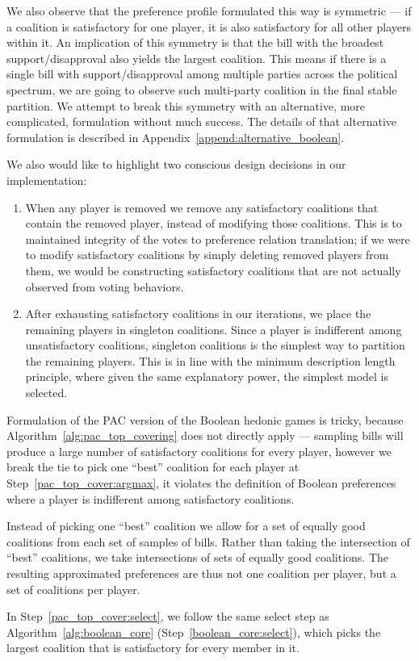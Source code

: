 We also observe that the preference profile formulated this way is symmetric ---
if a coalition is satisfactory for one player, it is also satisfactory for all
other players within it.
An implication of this symmetry is that the bill with the broadest
support/disapproval also yields the largest coalition.
This means if there is a single bill with support/disapproval among multiple
parties across the political spectrum, we are going to observe such multi-party
coalition in the final stable partition.
We attempt to break this symmetry with an alternative, more complicated,
formulation without much success.
The details of that alternative formulation is described in
Appendix~\ref{append:alternative_boolean}.

We also would like to highlight two conscious design decisions in our
implementation:

\begin{enumerate}
  \item When any player is removed we remove any satisfactory coalitions that
    contain the removed player, instead of modifying those coalitions.
    This is to maintained integrity of the votes to preference relation
    translation; if we were to modify satisfactory coalitions by simply
    deleting removed players from them, we would be constructing satisfactory
    coalitions that are not actually observed from voting behaviors.
  \item After exhausting satisfactory coalitions in our iterations, we place
    the remaining players in singleton coalitions.
    Since a player is indifferent among unsatisfactory coalitions, singleton
    coalitions is the simplest way to partition the remaining players.
    This is in line with the minimum description length principle, where given
    the same explanatory power, the simplest model is selected.
\end{enumerate}

Formulation of the PAC version of the Boolean hedonic games is tricky, because
Algorithm~\ref{alg:pac_top_covering} does not directly apply --- sampling bills
will produce a large number of satisfactory coalitions for every player, however
we break the tie to pick one ``best'' coalition for each player at
Step~\ref{pac_top_cover:argmax}, it violates the definition of Boolean
preferences where a player is indifferent among satisfactory coalitions.

Instead of picking one ``best'' coalition we allow for a set of equally good
coalitions from each set of samples of bills.
Rather than taking the intersection of ``best'' coalitions, we take intersections
of sets of equally good coalitions.
The resulting approximated preferences are thus not one coalition per player,
but a set of coalitions per player.

In Step~\ref{pac_top_cover:select}, we follow the same select step as
Algorithm~\ref{alg:boolean_core} (Step~\ref{boolean_core:select}), which picks
the largest coalition that is satisfactory for every member in it.

